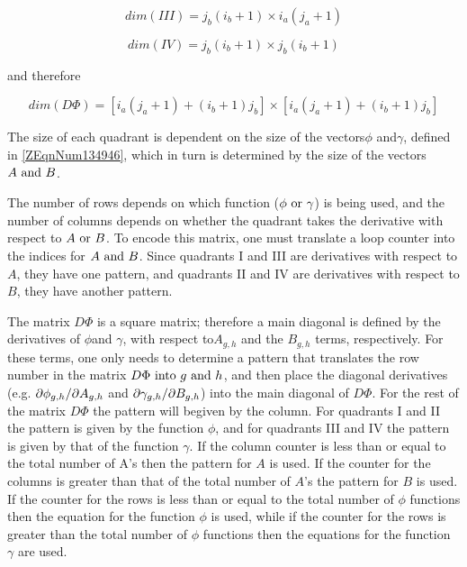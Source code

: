 \begin{equation*}
    dim\left(III\right)=j_{b} \left(i_{b} +1\right)\times i_{a} \left(j_{a} +1\right) 
\end{equation*} 

\begin{equation*}
    dim\left(IV\right)=j_{b} \left(i_{b} +1\right)\times j_{b} \left(i_{b} +1\right) 
\end{equation*} 

and therefore

\begin{equation} \label{4.9)} 
    dim(D\Phi )=\left[i_{a} \left(j_{a} + 1\right)
    + \left(i_{b} +1\right)j_{b} \right] 
    \times \left[i_{a} \left(j_{a} + 1\right)
    + \left(i_{b} + 1\right) j_{b} \right]
\end{equation}

The size of each quadrant is dependent on the size of the vectors$\phi $
and$\gamma $, defined in \eqref{ZEqnNum134946}, which in turn is determined by
the size of the vectors $A\text{ and }B$.

The number of rows depends on which function ($\phi \text{ or } \gamma $) is
being used, and the number of columns depends on whether the quadrant takes the
derivative with respect to $A\text{ or }B$. To encode this matrix, one must
translate a loop counter into the indices for $A\text{ and }B$. Since
quadrants I and III are derivatives with respect to $A$, they have one pattern,
and quadrants II and IV are derivatives with respect to $B$, they have another
pattern.

The matrix $D\Phi $ is a square matrix; therefore a main diagonal is defined by
the derivatives of $\phi $and $\gamma $, with respect to$A_{g,h} $ and the
$B_{g,h} $ terms, respectively. For these terms, one only needs to determine a
pattern that translates the row number in the matrix $D\Phi \text{ into } g\text{ and } h$,
and then place the diagonal derivatives (e.g. $\partial \phi_{g,h} / \partial A_{g,h} $ and
$\partial \gamma_{g,h} / \partial B_{g,h} $) into the main diagonal of $D\Phi $. For the
rest of the matrix $D\Phi $ the pattern will begiven by the column. For
quadrants I and II the pattern is given by the function $\phi $, and for
quadrants III and IV the pattern is given by that of the function $\gamma $. If
the column counter is less than or equal to the total number of A's then the
pattern for $A$ is used. If the counter for the columns is greater than that of
the total number of $A$'s the pattern for $B$ is used. If the counter for the
rows is less than or equal to the total number of $\phi $ functions then the
equation for the function $\phi $ is used, while if the counter for the rows is
greater than the total number of $\phi $ functions then the equations for the
function $\gamma $ are used.

